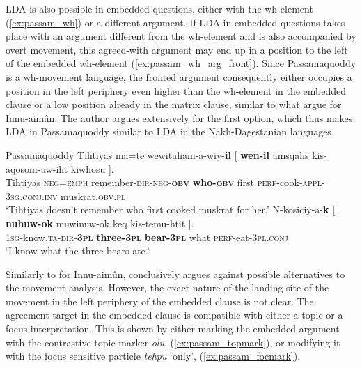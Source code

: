 \documentclass[output=paper
,modfonts
,nonflat]{langsci/langscibook}
\begin{document}
LDA is also possible in embedded questions, either with the wh-element (\ref{ex:passam_wh}) or a different argument. If LDA in embedded questions takes place with an argument different from the wh-element and is also accompanied by overt movement, this agreed-with argument may end up in a position to the left of the embedded wh-element  (\ref{ex:passam_wh_arg_front}). Since Passamaquoddy is a wh-movement language, the fronted argument consequently either occupies a position in the left periphery even higher than the wh-element in the embedded clause or a low position already in the matrix clause, similar to what \citet{Branigan_MacKenzie2002} argue for Innu-aim\^{u}n. The author argues extensively for the first option, which thus makes LDA in Passamaquoddy similar to LDA in the Nakh-Dagestanian languages.
\begin{exe}
\ex Passamaquoddy \citep[][259]{Bruening2001a}
	\xlist
	\ex \label{ex:passam_wh}	
		\gll Tihtiyas ma=te wewitaham-a-wiy-\textbf{il} [ \textbf{wen-il} amsqahs kis-aqosom-uw-iht kiwhosu ].\\
			 Tihtiyas \textsc{neg=emph} remember-\textsc{dir-neg-\textbf{obv}} {} \textbf{who-\textsc{obv}} first \textsc{perf}-cook-\textsc{appl-3sg.conj.inv} muskrat.\textsc{obv.pl}\\
		\glt `Tihtiyas doesn't remember who first cooked muskrat for her.'
	\ex \label{ex:passam_wh_arg_front}
		\gll N-kosiciy-a-\textbf{k} [ \textbf{nuhuw-ok} muwinuw-ok keq  kis-temu-htit ].\\
			 \textsc{1sg}-know.\textsc{ta-dir-\textbf{3pl}} {} \textbf{three-\textsc{3pl}} \textbf{bear-\textsc{3pl}} what \textsc{perf-}eat\textsc{-3pl.conj}\\
		\glt `I know what the three bears ate.' 
	\endxlist
\end{exe}
Similarly to \citet{Branigan_MacKenzie2002} for Innu-aim\^{u}n, \citet{Bruening2001a} conclusively argues against possible alternatives to the movement analysis. However, the exact nature of the landing site of the movement in the left periphery of the embedded clause is not clear. The agreement target in the embedded clause is compatible with either a topic or a focus interpretation. This is shown by either marking the embedded argument with the contrastive topic marker \textit{olu}, (\ref{ex:passam_topmark}), or modifying it with the focus sensitive particle \textit{tehpu} `only', (\ref{ex:passam_focmark}).
\end{document}
